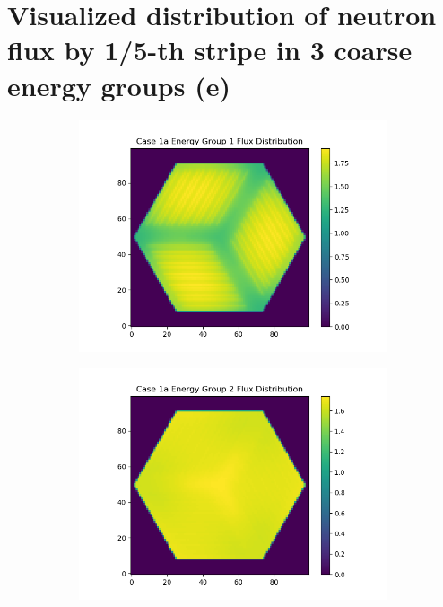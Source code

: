\documentclass[letterpaper,11pt]{report}
\begin{document}
\section{Visualized distribution of neutron flux by 1/5-th stripe in 3 coarse energy groups (e)}
\begin{figure}[H]
    \centering
    \begin{subfigure}{.33\textwidth}
        \centering
        \includegraphics[width=1.1\linewidth]{../../phase1a/case1a/analysis_output/p1a_1a_e_eg1.png}
        \caption{}
      \end{subfigure}%
      \begin{subfigure}{.33\textwidth}
        \centering
        \includegraphics[width=1.1\linewidth]{../../phase1a/case1a/analysis_output/p1a_1a_e_eg2.png}

\end{subfigure}
\end{figure}
\end{document}
